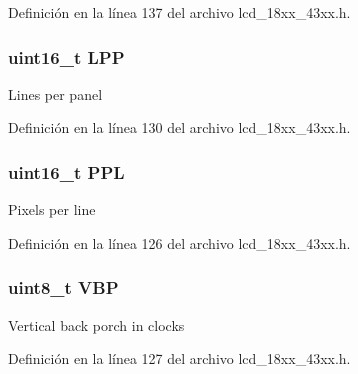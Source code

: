 Definición en la línea 137 del archivo lcd\+\_\+18xx\+\_\+43xx.\+h.

\subsubsection[{\texorpdfstring{L\+PP}{LPP}}]{\setlength{\rightskip}{0pt plus 5cm}uint16\+\_\+t L\+PP}\hypertarget{struct_l_c_d___c_o_n_f_i_g___t_a02f7f26cd8ac7e2ede0206168401e386}{}\label{struct_l_c_d___c_o_n_f_i_g___t_a02f7f26cd8ac7e2ede0206168401e386}
Lines per panel 

Definición en la línea 130 del archivo lcd\+\_\+18xx\+\_\+43xx.\+h.

\subsubsection[{\texorpdfstring{P\+PL}{PPL}}]{\setlength{\rightskip}{0pt plus 5cm}uint16\+\_\+t P\+PL}\hypertarget{struct_l_c_d___c_o_n_f_i_g___t_a34a9e7f684990f3d8c924b0b7ad060b1}{}\label{struct_l_c_d___c_o_n_f_i_g___t_a34a9e7f684990f3d8c924b0b7ad060b1}
Pixels per line 

Definición en la línea 126 del archivo lcd\+\_\+18xx\+\_\+43xx.\+h.

\subsubsection[{\texorpdfstring{V\+BP}{VBP}}]{\setlength{\rightskip}{0pt plus 5cm}uint8\+\_\+t V\+BP}\hypertarget{struct_l_c_d___c_o_n_f_i_g___t_a2933e02b3716a8b2121c0f2dec2e3834}{}\label{struct_l_c_d___c_o_n_f_i_g___t_a2933e02b3716a8b2121c0f2dec2e3834}
Vertical back porch in clocks 

Definición en la línea 127 del archivo lcd\+\_\+18xx\+\_\+43xx.\+h.

